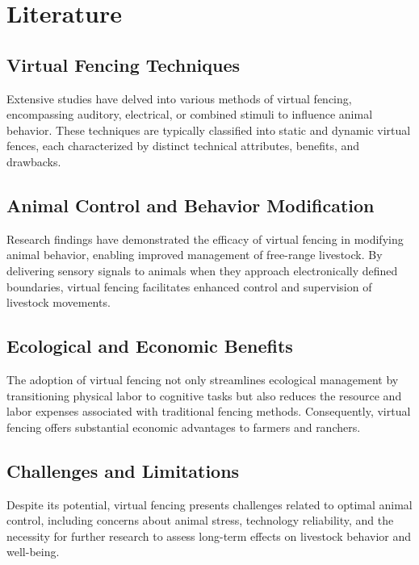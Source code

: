 \documentclass[conference]{main}
\begin{document}
\section{Literature}


\subsection{Virtual Fencing Techniques}

Extensive studies have delved into various methods of virtual fencing,
encompassing auditory, electrical, or combined stimuli to influence animal
behavior. These techniques are typically classified into static and dynamic
virtual fences, each characterized by distinct technical attributes, benefits,
and drawbacks.

\subsection{Animal Control and Behavior Modification}

Research findings have demonstrated the efficacy of virtual fencing in modifying
animal behavior, enabling improved management of free-range livestock. By
delivering sensory signals to animals when they approach electronically defined
boundaries, virtual fencing facilitates enhanced control and supervision of
livestock movements.

\subsection{Ecological and Economic Benefits}

The adoption of virtual fencing not only streamlines ecological management by
transitioning physical labor to cognitive tasks but also reduces the resource
and labor expenses associated with traditional fencing methods. Consequently,
virtual fencing offers substantial economic advantages to farmers and ranchers.

\subsection{Challenges and Limitations}

Despite its potential, virtual fencing presents challenges related to optimal
animal control, including concerns about animal stress, technology reliability,
and the necessity for further research to assess long-term effects on livestock
behavior and well-being.
\end{document}
